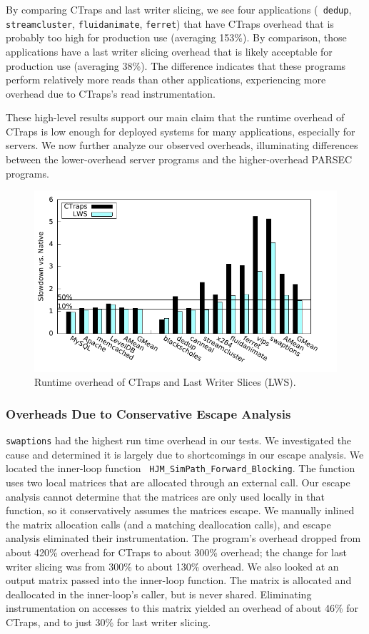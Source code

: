 \documentclass[preprint,9pt]{sigplanconf}
\newcommand{\ctraps}{CTraps\xspace}
\begin{document}
By comparing \ctraps and last writer slicing, we see four applications ({\tt
dedup}, {\tt streamcluster}, {\tt fluidanimate}, {\tt ferret}) that have
\ctraps overhead that is probably too high for production use (averaging
153\%).  By comparison, those applications have a last writer slicing overhead
that is likely acceptable for production use (averaging 38\%).  The difference
indicates that these programs perform relatively more reads than other
applications, experiencing more overhead due to \ctraps's read instrumentation.

These high-level results support our main claim that the runtime overhead of
\ctraps is low enough for deployed systems for many applications, especially
for servers.  We now further analyze our observed overheads, illuminating
differences between the lower-overhead server programs and the higher-overhead
PARSEC programs.

\begin{figure}
\centering
\includegraphics[width=.9\columnwidth]{plots/perf.pdf}
\caption{\label{fig:perfall}Runtime overhead of \ctraps and Last Writer Slices (LWS).}
\end{figure}

\subsubsection{Overheads Due to Conservative Escape Analysis}
\label{sec:eval:conservative}
{\tt swaptions} had the highest run time overhead in our tests.  We
investigated the cause and determined it is largely due to shortcomings in our
escape analysis.  We located the inner-loop function {\tt
HJM\_SimPath\_Forward\_Blocking}.  The function uses two local matrices that
are allocated through an external call.  Our escape analysis cannot determine
that the matrices are only used locally in that function, so it conservatively
assumes the matrices escape.  We manually inlined the matrix allocation calls
(and a matching deallocation calls), and escape analysis eliminated their
instrumentation.  The program's overhead dropped from about 420\% overhead for
\ctraps to about 300\% overhead; the change for last writer slicing was from
300\% to about 130\% overhead.  We also looked at an output matrix passed into
the inner-loop function.  The matrix is allocated and deallocated in the
inner-loop's caller, but is never shared.  Eliminating instrumentation on
accesses to this matrix yielded an overhead of about 46\% for \ctraps, and to
just 30\% for last writer slicing.  
\end{document}
